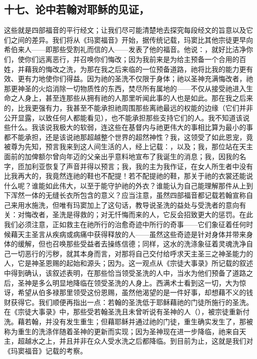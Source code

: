 
\subsection{十七、论中若翰对耶稣的见证，}

这些就是四部福音的平行经文；让我们尽可能清楚地去探究每段经文的旨意以及它们之间的差异。我们将从《玛窦福音》开始，据传统记载，玛窦比其他宗徒更早向希伯来人——即那些受割礼而信的人——发表了他的福音。他说：，就好比洁净你们，使你们远离恶行，并召唤你们悔改；因为我前来是为给主预备一个合用的百姓，并藉我的悔改之洗，为那在我之后来临的一位预备道路，祂将比我的能力更有效、更有力地使你们得益。因为祂的圣洗不仅限于身体；祂以圣神充满悔改者，祂那更神圣的火焰消除一切物质性的东西，焚尽所有属地的——不仅从接受祂进入生命之人身上，甚至连那些从拥有祂的人那里听闻此事的人也是如此。那在我之后来的，比我更强有力，我甚至不能承担祂周围那些离祂最远的权能的边缘（它们并非公开显露，以致任何人都能看见），也不能承担那些支持它们的人。我不知道该说些什么。我该说我极大的软弱，连这些在基督内与祂更伟大的事相比算为最小的事都不能承担，还是该说祂那超越整个世界的超然神性？我，这领受了如此恩宠，竟被尊为先知，预言我来到这人间生活的人，经上记载：，以及；我，那位站在天主面前的加俾额尔曾向年迈的父亲出乎意料地宣布了我诞生的消息；我，因我的名字，匝加利亚恢复了声音并得以预言；我，我的主为我作证，在女人所生者中没有比我再大的，我竟然连祂的鞋也不配提！若不配提祂的鞋，那关于祂的衣裳还能说什么呢？谁能如此伟大，以至于能守护祂的外衣？谁能认为自己能理解那件从上到下浑然一体的无缝长衣所包含的意义？应当注意，虽然四部福音都记载若翰宣称自己来用水施洗，但唯有玛窦加上了这句话，教导说圣洗的益处与受洗者的意向有关：对悔改者，圣洗是得救的；对无忏悔而来的人，它反会招致更大的惩罚。在此我们必须注意，正如救主在祂所行的治愈奇迹中所行的奇事——它们象征着任何时候藉天主圣言从疾病或病痛中获得释放的人——虽然这些奇迹是针对身体并带来身体的缓解，但也召唤那些受益者去操练信德；同样，这水的洗涤象征着灵魂洗净自己一切恶行的污秽，就其本身而言，对那将自己交付给呼求天主圣三之神圣能力的人，它是神圣恩赐的起始和源头；因为。这一观点从《宗徒大事录》所记载的叙述中得到确认，该叙述表明，在那些恰当领受圣洗的人中，当水为他们预备了道路之后，圣神是多么明显地降临在领受圣洗的人身上。西满术士看到这一切，大为惊讶，希望从伯多禄那里领受这份恩赐，虽然他渴望的是一件好事，却想藉不义的钱财获得它。我们顺便再指出一点：若翰的圣洗低于耶稣藉祂的门徒所施行的圣洗。在《宗徒大事录》中，那些受若翰圣洗且未曾听说有圣神的人（），被宗徒重新付洗。藉若翰，并没有发生重生；但藉耶稣并通过祂的门徒，重生确实发生了，那被称为重生的洗涤伴随着圣神的更新而实现；因为圣神现在进一步降临，祂来自天主，超越水之上，并且并非在众人受水洗之后都降临。到目前为止，这就是我们对《玛窦福音》记载的考察。\par

